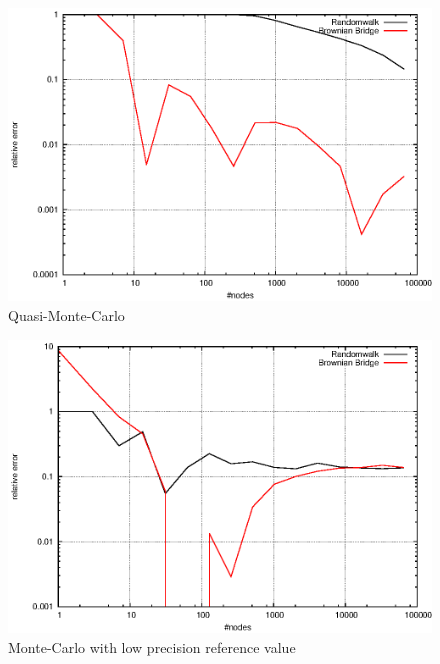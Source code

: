 \documentclass[]{article}
\begin{document}
\begin{figure}[!ht]
\centering
\includegraphics[width=.9\textwidth]{task2_qmc.eps}
\caption{Quasi-Monte-Carlo}
\label{fig:Task2b}
\end{figure}

\begin{figure}[!ht]
\centering
\includegraphics[width=.9\textwidth]{task2_mc_low.eps}
\caption{Monte-Carlo with low precision reference value}
\label{fig:Task2c}
\end{figure}
\clearpage
\end{document}
